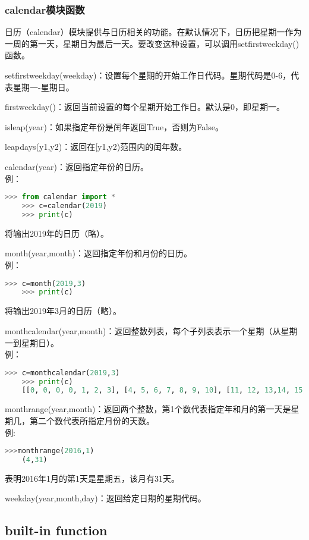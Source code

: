 \documentclass[11pt,a4paper]{article}
\begin{document}
\subsubsection{calendar模块函数}

日历（calendar）模块提供与日历相关的功能。在默认情况下，日历把星期一作为一周的第一天，星期日为最后一天。要改变这种设置，可以调用setfirstweekday()函数。

setfirstweekday(weekday)：设置每个星期的开始工作日代码。星期代码是0-6，代表星期一-星期日。

firstweekday()：返回当前设置的每个星期开始工作日。默认是0，即星期一。

isleap(year)：如果指定年份是闰年返回True，否则为False。

leapdays(y1,y2)：返回在[y1,y2)范围内的闰年数。

calendar(year)：返回指定年份的日历。\\
例：
\begin{lstlisting}[language={Python}]
    >>> from calendar import *
    >>> c=calendar(2019)
    >>> print(c)
\end{lstlisting}
将输出2019年的日历（略）。

month(year,month)：返回指定年份和月份的日历。\\
例：
\begin{lstlisting}[language={Python}]
    >>> c=month(2019,3)
    >>> print(c)
\end{lstlisting}
将输出2019年3月的日历（略）。

monthcalendar(year,month)：返回整数列表，每个子列表表示一个星期（从星期一到星期日）。\\
例：
\begin{lstlisting}[language={Python}]
    >>> c=monthcalendar(2019,3)
    >>> print(c)
    [[0, 0, 0, 0, 1, 2, 3], [4, 5, 6, 7, 8, 9, 10], [11, 12, 13,14, 15, 16, 17], [18, 19, 20, 21, 22, 23, 24], [25, 26, 27,28, 29, 30, 31]]
\end{lstlisting}

monthrange(year,month)：返回两个整数，第1个数代表指定年和月的第一天是星期几，第二个数代表所指定月份的天数。\\
例:
\begin{lstlisting}[language={Python}]
    >>>monthrange(2016,1)
    (4,31)
\end{lstlisting}
表明2016年1月的第1天是星期五，该月有31天。

weekday(year,month,day)：返回给定日期的星期代码。

\subsection{built-in function}
\end{document}
